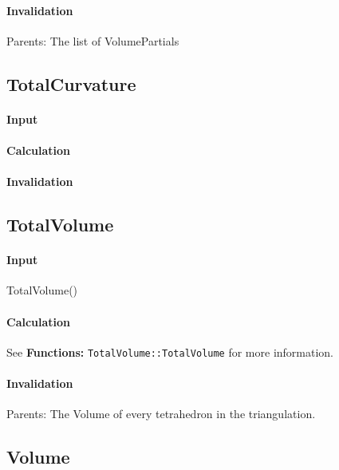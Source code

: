 \paragraph{Invalidation}

\bigskip Parents: The list of VolumePartials 

\subsection{TotalCurvature}

\paragraph{Input}

\paragraph{Calculation}

\paragraph{Invalidation}

\bigskip

\subsection{TotalVolume}

\paragraph{Input}

TotalVolume()

\paragraph{Calculation}

See \textbf{Functions: }\texttt{TotalVolume::TotalVolume} for more
information.

\paragraph{Invalidation}

\bigskip Parents: The Volume of every tetrahedron in the triangulation.

\subsection{Volume}

